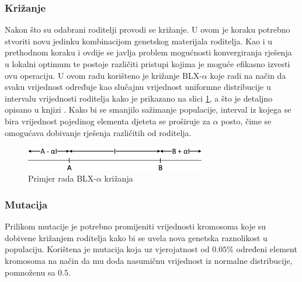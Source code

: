 \documentclass[times, utf8, zavrsni, numeric]{fer}
\begin{document}
\subsubsection{Križanje}
Nakon što su odabrani roditelji provodi se križanje. 
U ovom je koraku potrebno stvoriti novu jedinku kombinacijom genetskog materijala roditelja. 
Kao i u prethodnom koraku i ovdije se javlja problem mogućnosti konvergiranja rješenja u lokalni optimum te postoje različiti pristupi kojima je moguće efikasno izvesti ovu operaciju.
U ovom radu korišteno je križanje BLX-$\alpha$ koje radi na način da svaku vrijednost određuje kao slučajnu vrijednost uniformne distribucije u intervalu vrijednosti roditelja kako je prikazano na slici \ref{fig:blx}, a što je detaljno opisano u knjizi \cite{GeneticAlgorithms}. 
Kako bi se smanjilo sažimanje populacije, interval iz kojega se bira vrijednost pojedinog elementa djeteta se proširuje za $\alpha$ posto, čime se omogućava dobivanje rješenja različitih od roditelja.

\begin{figure}[ht!]
    \centering
    \includegraphics[width=0.7\textwidth]{Images/Blx-a.pdf}
    \captionsetup{justification=centering}
    \caption{Primjer rada BLX-$\alpha$ križanja}
    \label{fig:blx}
\end{figure}

\subsubsection{Mutacija}
Prilikom mutacije je potrebno promijeniti vrijednosti kromosoma koje su dobivene križanjem roditelja kako bi se uvela nova genetska raznolikost u populaciju.
Korištena je mutacija koja uz vjerojatnost od $0.05\%$ određeni element kromosoma na način da mu doda nasumičnu vrijednost iz normalne distribucije, pomnoženu sa $0.5$. 
\end{document}
